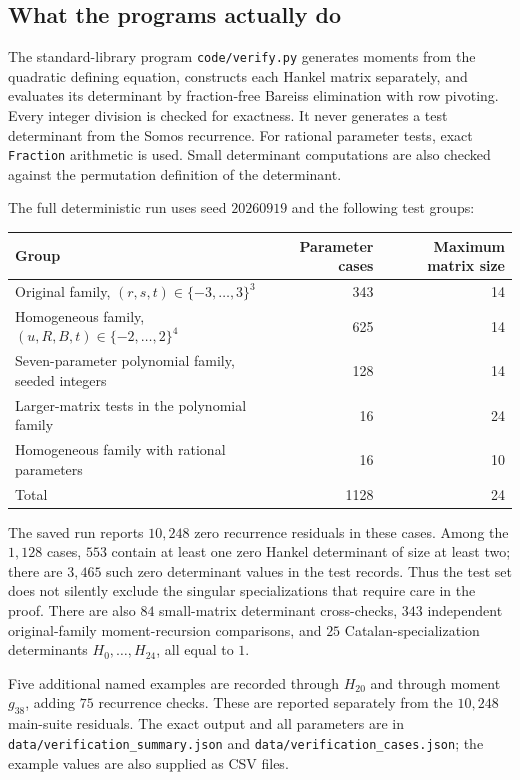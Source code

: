 \documentclass[11pt,a4paper]{article}
\numberwithin{equation}{section}
\theoremstyle{definition}
\begin{document}
\subsection{What the programs actually do}
The standard-library program \texttt{code/verify.py} generates moments from
the quadratic defining equation, constructs each Hankel matrix separately,
and evaluates its determinant by fraction-free Bareiss elimination with row
pivoting. Every integer division is checked for exactness. It never generates
a test determinant from the Somos recurrence. For rational parameter tests,
exact \texttt{Fraction} arithmetic is used. Small determinant computations
are also checked against the permutation definition of the determinant.

The full deterministic run uses seed $20260919$ and the following test groups:
\begin{center}
\small\setlength{\tabcolsep}{4.5pt}
\begin{tabular}{@{}lrr@{}}
\toprule
Group & Parameter cases & Maximum matrix size\\
\midrule
Original family, $(r,s,t)\in\{-3,\ldots,3\}^3$ &343&14\\
Homogeneous family, $(u,R,B,t)\in\{-2,\ldots,2\}^4$&625&14\\
Seven-parameter polynomial family, seeded integers&128&14\\
Larger-matrix tests in the polynomial family&16&24\\
Homogeneous family with rational parameters&16&10\\
\midrule
Total&1128&24\\
\bottomrule
\end{tabular}
\end{center}

The saved run reports $10{,}248$ zero recurrence residuals in these cases.
Among the $1{,}128$ cases, $553$ contain at least one zero Hankel determinant
of size at least two; there are $3{,}465$ such zero determinant values in the
test records. Thus the test set does not silently exclude the singular
specializations that require care in the proof. There are also $84$
small-matrix determinant cross-checks, $343$ independent original-family
moment-recursion comparisons, and $25$ Catalan-specialization determinants
$H_0,\ldots,H_{24}$, all equal to $1$.

Five additional named examples are recorded through $H_{20}$ and through
moment $g_{38}$, adding $75$ recurrence checks. These are reported separately
from the $10{,}248$ main-suite residuals. The exact output and all parameters
are in \texttt{data/verification\_summary.json} and
\texttt{data/verification\_cases.json}; the example values are also supplied
as CSV files.
\end{document}
